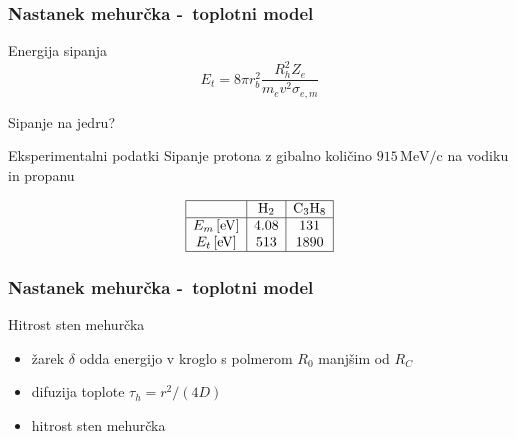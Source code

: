 \documentclass[14pt, t]{beamer}
\begin{document}
\begin{frame}
  \frametitle{Nastanek mehurčka -~toplotni model}
  \begin{block}{Energija sipanja}
    \[   E_t = 8 \pi r_b ^2 \frac{R_h ^2 Z_e}{m_e v ^2 \sigma_{e, m}}
    \]

    Sipanje na jedru?
  \end{block}
  \begin{block}{Eksperimentalni podatki}
    Sipanje protona z gibalno količino \( 915 \, \mathrm{MeV}/ \mathrm{c} \) na vodiku in propanu
  \end{block}
  \vspace{-0.5cm}
  \begin{center}
    \[\begin{array}{|c|c|c|} \hline
      & \mathrm{H}_2 & \mathrm{C}_3 \mathrm{H}_8 \\ \hline
      E_m \, [ \mathrm{eV}] & 4.08 & 131 \\
      E_t \, [ \mathrm{eV}] & 513 & 1890 \\ \hline
      \end{array}
    \]
  \end{center}
\end{frame}

\begin{frame}
  \frametitle{Nastanek mehurčka -~toplotni model}
  \begin{block}{Hitrost sten mehurčka}
    \begin{itemize}
      \item<1-> žarek \( \delta \) odda energijo v kroglo s polmerom \( R_0 \) manjšim od \( R_C \) 
      \item<2-> difuzija toplote \( \tau_h = r ^2 / (4D) \)
      \item <3-> hitrost sten mehurčka
    \end{itemize}

  \end{block}

\end{frame}
\end{document}
